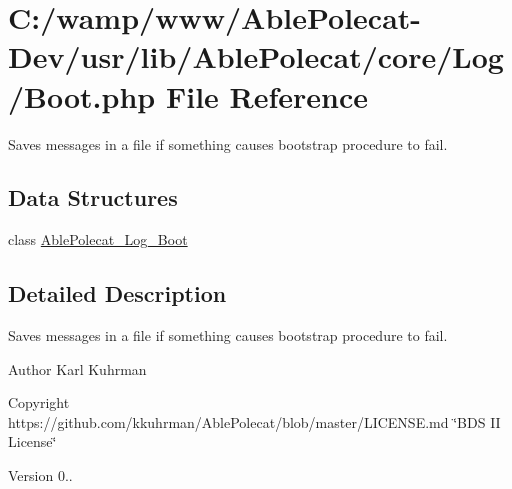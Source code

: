 \hypertarget{_boot_8php}{}\section{C\+:/wamp/www/\+Able\+Polecat-\/\+Dev/usr/lib/\+Able\+Polecat/core/\+Log/\+Boot.php File Reference}
\label{_boot_8php}


Saves messages in a file if something causes bootstrap procedure to fail.  


\subsection*{Data Structures}
\begin{DoxyCompactItemize}
\item 
class \hyperlink{class_able_polecat___log___boot}{Able\+Polecat\+\_\+\+Log\+\_\+\+Boot}
\end{DoxyCompactItemize}


\subsection{Detailed Description}
Saves messages in a file if something causes bootstrap procedure to fail. 

\begin{DoxyAuthor}{Author}
Karl Kuhrman 
\end{DoxyAuthor}
\begin{DoxyCopyright}{Copyright}
https\+://github.com/kkuhrman/\+Able\+Polecat/blob/master/\+L\+I\+C\+E\+N\+S\+E.\+md \char`\"{}\+B\+D\+S I\+I License\char`\"{} 
\end{DoxyCopyright}
\begin{DoxyVersion}{Version}
0.. 
\end{DoxyVersion}

